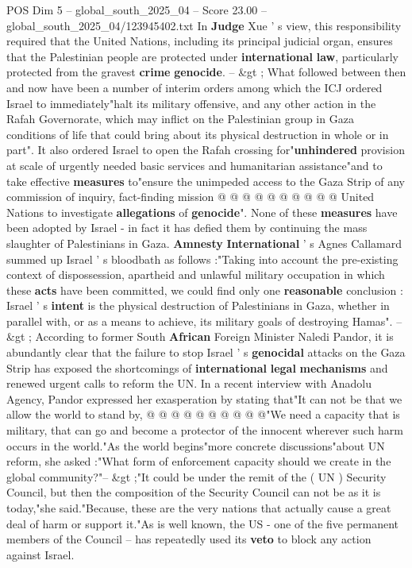 \begin{textsample}{POS Dim 5 – global\_south\_2025\_04 – Score 23.00 – global\_south\_2025\_04/123945402.txt}
In \textbf{Judge} Xue ' s view, this responsibility required that the United Nations, including its principal judicial organ, ensures that the Palestinian people are protected under \textbf{international} \textbf{law}, particularly protected from the gravest \textbf{crime} \textbf{genocide}. -- \&gt ; What followed between then and now have been a number of interim orders among which the ICJ ordered Israel to immediately"halt its military offensive, and any other action in the Rafah Governorate, which may inflict on the Palestinian group in Gaza conditions of life that could bring about its physical destruction in whole or in part".
It also ordered Israel to open the Rafah crossing for"\textbf{unhindered} provision at scale of urgently needed basic services and humanitarian assistance"and to take effective \textbf{measures} to"ensure the unimpeded access to the Gaza Strip of any commission of inquiry, fact-finding mission @ @ @ @ @ @ @ @ @ @ United Nations to investigate \textbf{allegations} of \textbf{genocide}".
None of these \textbf{measures} have been adopted by Israel - in fact it has defied them by continuing the mass slaughter of Palestinians in Gaza. \textbf{Amnesty} \textbf{International} ' s Agnes Callamard summed up Israel ' s bloodbath as follows :"Taking into account the pre-existing context of dispossession, apartheid and unlawful military occupation in which these \textbf{acts} have been committed, we could find only one \textbf{reasonable} conclusion : Israel ' s \textbf{intent} is the physical destruction of Palestinians in Gaza, whether in parallel with, or as a means to achieve, its military goals of destroying Hamas". -- \&gt ; According to former South \textbf{African} Foreign Minister Naledi Pandor, it is abundantly clear that the failure to stop Israel ' s \textbf{genocidal} attacks on the Gaza Strip has exposed the shortcomings of \textbf{international} \textbf{legal} \textbf{mechanisms} and renewed urgent calls to reform the UN.
In a recent interview with Anadolu Agency, Pandor expressed her exasperation by stating that"It can not be that we allow the world to stand by, @ @ @ @ @ @ @ @ @ @"We need a capacity that is military, that can go and become a protector of the innocent wherever such harm occurs in the world."As the world begins"more concrete discussions"about UN reform, she asked :"What form of enforcement capacity should we create in the global community?"-- \&gt ;"It could be under the remit of the ( UN ) Security Council, but then the composition of the Security Council can not be as it is today,"she said."Because, these are the very nations that actually cause a great deal of harm or support it."As is well known, the US - one of the five permanent members of the Council -- has repeatedly used its \textbf{veto} to block any action against Israel.

\end{textsample}
